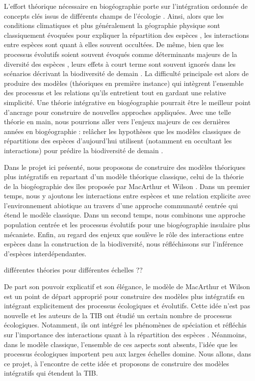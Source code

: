 L'effort théorique nécessaire en biogéographie porte sur l'intégration
ordonnée de concepts clés issus de différents champs de l'écologie
\cite{Thuiller2013}. Ainsi, alors que les conditions climatiques et plus
généralement la géographie physique sont classiquement évoquées pour
expliquer la répartition des espèces \cite{Kearney2004}, les
interactions entre espèces sont quant à elles souvent occultées. De
même, bien que les processus évolutifs soient souvent évoqués comme
déterminants majeurs de la diversité des espèces \cite{Rosindell2011},
leurs effets à court terme sont souvent ignorés \cite{Parmesan2006} dans
les scénarios décrivant la biodiversité de demain \cite{Lavergne2010}.
La difficulté principale est alors de produire des modèles (théoriques
en première instance) qui intègrent l'ensemble des processus et les
relations qu'ils entretient \cite{Thuiller2013} tout en gardant une
relative simplicité. Une théorie intégrative en biogéographie pourrait
être le meilleur point d'ancrage pour construire de nouvelles approches
appliquées. Avec une telle théorie en main, nous pourrions aller vers
l'enjeux majeurs de ces dernières années en biogéographie : relâcher les
hypothèses que les modèles classiques de répartitions des espèces
d'aujourd'hui utilisent (notamment en occultant les interactions) pour
prédire la biodiversité de demain \cite{Guisan2011}.

Dans le projet ici présenté, nous proposons de construire des modèles
théoriques plus intégratifs en repartant d'un modèle théorique
classique, celui de la théorie de la biogéographie des îles proposée par
MacArthur et Wilson \cite{MacArthur1967}. Dans un premier temps, nous y
ajoutons les interactions entre espèces et une relation explicite avec
l'environnement abiotique au travers d'une approche communauté centrée
qui étend le modèle classique. Dans un second temps, nous combinons une
approche population centrée et les processus évolutifs pour une
biogéographie insulaire plus mécaniste. Enfin, au regard des enjeux que
soulève le rôle des interactions entre espèces dans la construction de
la biodiversité, nous réfléchissons sur l'inférence d'espèces
interdépendantes.

différentes théories pour différentes échelles ??

De part son pouvoir explicatif et son élégance, le modèle de MacArthur
et Wilson est un point de départ approprié pour construire des modèles
plus intégratifs en intégrant explicitement des processus écologiques et
évolutifs. Cette idée n'est pas nouvelle et les auteurs de la TIB ont
étudié un certain nombre de processus écologiques. Notamment, ils ont
intégré les phénomènes de spéciation \cite{MacArthur1967} et réfléchis
sur l'importance des interactions quant à la répartition des espèces
\cite{MacArthur1984}. Néanmoins, dans le modèle classique, l'ensemble de
ces aspects sont absents, l'idée que les processus écologiques importent
peu aux larges échelles domine. Nous allons, dans ce projet, à
l'encontre de cette idée et proposons de construire des modèles
intégratifs qui étendent la TIB.

